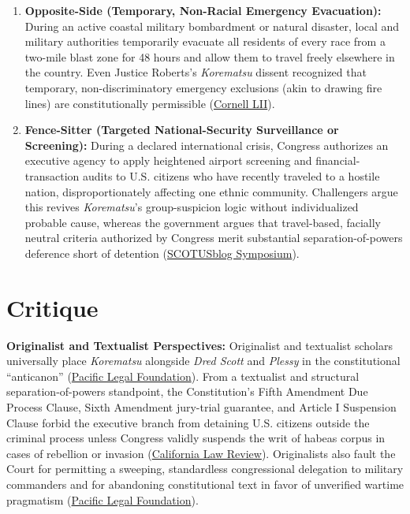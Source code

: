 \documentclass[12pt]{article}
\begin{document}
\begin{enumerate}
    \item \textbf{Opposite-Side (Temporary, Non-Racial Emergency Evacuation):} During an active coastal military bombardment or natural disaster, local and military authorities temporarily evacuate all residents of every race from a two-mile blast zone for 48 hours and allow them to travel freely elsewhere in the country. Even Justice Roberts's \textit{Korematsu} dissent recognized that temporary, non-discriminatory emergency exclusions (akin to drawing fire lines) are constitutionally permissible (\href{https://www.law.cornell.edu/supremecourt/text/323/214}{Cornell LII}).
    \item \textbf{Fence-Sitter (Targeted National-Security Surveillance or Screening):} During a declared international crisis, Congress authorizes an executive agency to apply heightened airport screening and financial-transaction audits to U.S. citizens who have recently traveled to a hostile nation, disproportionately affecting one ethnic community. Challengers argue this revives \textit{Korematsu}'s group-suspicion logic without individualized probable cause, whereas the government argues that travel-based, facially neutral criteria authorized by Congress merit substantial separation-of-powers deference short of detention (\href{https://www.scotusblog.com/2018/06/symposium-trump-v-hawaii-korematsus-ghost-and-national-security-masquerades/}{SCOTUSblog Symposium}).
\end{enumerate}

\section{Critique}
\textbf{Originalist and Textualist Perspectives:} Originalist and textualist scholars universally place \textit{Korematsu} alongside \textit{Dred Scott} and \textit{Plessy} in the constitutional ``anticanon'' (\href{https://pacificlegal.org/originalism-vs-textualism-vs-living-constitutionalism/}{Pacific Legal Foundation}). From a textualist and structural separation-of-powers standpoint, the Constitution's Fifth Amendment Due Process Clause, Sixth Amendment jury-trial guarantee, and Article I Suspension Clause forbid the executive branch from detaining U.S. citizens outside the criminal process unless Congress validly suspends the writ of habeas corpus in cases of rebellion or invasion (\href{https://www.californialawreview.org/print/constructive-constitutional-history-and-habeas-corpus-today}{California Law Review}). Originalists also fault the Court for permitting a sweeping, standardless congressional delegation to military commanders and for abandoning constitutional text in favor of unverified wartime pragmatism (\href{https://pacificlegal.org/originalism-vs-textualism-vs-living-constitutionalism/}{Pacific Legal Foundation}).
\end{document}
